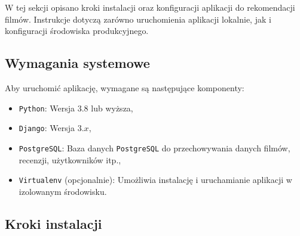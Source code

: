 \documentclass[../main.tex]{subfiles}
\begin{document}
W tej sekcji opisano kroki instalacji oraz konfiguracji aplikacji do rekomendacji filmów. Instrukcje dotyczą zarówno uruchomienia aplikacji lokalnie, jak i konfiguracji środowiska produkcyjnego.

\subsection{Wymagania systemowe}
Aby uruchomić aplikację, wymagane są następujące komponenty:
\begin{itemize}
	\item \texttt{Python}: Wersja $3.8$ lub wyższa,
    \item \texttt{Django}: Wersja $3.x$,
    \item \texttt{PostgreSQL}: Baza danych \texttt{PostgreSQL} do przechowywania danych filmów, recenzji, użytkowników itp.,
    \item \texttt{Virtualenv} (opcjonalnie): Umożliwia instalację i uruchamianie aplikacji w izolowanym środowisku.
\end{itemize}

\subsection{Kroki instalacji}

\newcommand{\quickcodefile}[2]{\inputminted[fontsize=\scriptsize]{#1}{./resources/code/instalacja/#2}}
\end{document}
